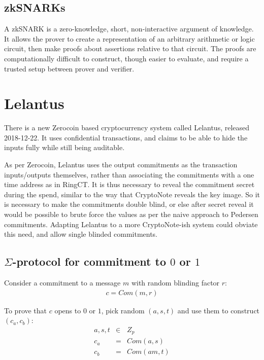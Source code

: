 \documentclass{article}
\begin{document}
\subsection{zkSNARKs}

A zkSNARK is a zero-knowledge, short, non-interactive argument of knowledge.  It allows the prover to create a representation of an arbitrary arithmetic or logic circuit, then make proofs about assertions relative to that circuit.  The proofs are computationally difficult to construct, though easier to evaluate, and require a trusted setup between prover and verifier.



\section{Lelantus}

There is a new Zerocoin based cryptocurrency system called Lelantus, released 2018-12-22.  It uses confidential transactions, and claims to be able to hide the inputs fully while still being auditable.  

As per Zerocoin, Lelantus uses the output commitments as the transaction inputs/outputs themselves, rather than associating the commitments with a one time address as in RingCT.  It is thus necessary to reveal the commitment secret during the spend, similar to the way that CryptoNote reveals the key image.  So it is necessary to make the commitments double blind, or else after secret reveal it would be possible to brute force the values as per the naive approach to Pedersen commitments.  Adapting Lelantus to a more CryptoNote-ish system could obviate this need, and allow single blinded commitments.


\subsection{$\Sigma$-protocol for commitment to $0$ or $1$}

Consider a commitment to a message $m$ with random blinding factor $r$:
\begin{eqnarray}
  c=Com(m, r)
\end{eqnarray}

To prove that $c$ opens to $0$ or $1$, pick random $(a,s,t)$ and use them to construct $(c_a, c_b)$:
\begin{eqnarray}
  a,s,t &\in& Z_p\\
  c_a &=& Com(a, s)\\
  c_b &=& Com(am, t)
\end{eqnarray}
\end{document}
